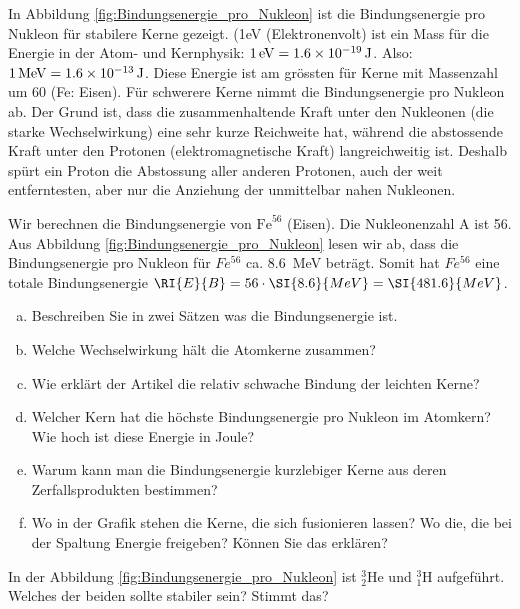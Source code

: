 \documentclass[12pt,a4paper,twoside]{article}
\begin{document}
In Abbildung \ref{fig:Bindungsenergie_pro_Nukleon} ist die Bindungsenergie pro Nukleon für stabilere Kerne gezeigt. 
(1eV (Elektronenvolt) ist ein Mass für die Energie in der Atom- und Kernphysik:
$\SI{1}{eV} = \SI{1.6E-19}{J}$. Also: $\SI{1}{MeV} = \SI{1.6E-13}{J}$.
Diese Energie ist am grössten für Kerne mit Massenzahl um 60 (Fe: Eisen).
Für schwerere Kerne nimmt die Bindungsenergie pro Nukleon ab. Der Grund ist,
dass die zusammenhaltende Kraft unter den Nukleonen (die starke Wechselwirkung) eine sehr kurze Reichweite hat,
während die abstossende Kraft unter den Protonen (elektromagnetische Kraft) langreichweitig ist.
Deshalb spürt ein Proton die Abstossung aller anderen Protonen, auch der weit entferntesten,
aber nur die Anziehung der unmittelbar nahen Nukleonen.

 


Wir berechnen die Bindungsenergie von $\text{Fe}^{56}$ (Eisen). 
Die Nukleonenzahl A ist 56. Aus Abbildung \ref{fig:Bindungsenergie_pro_Nukleon} lesen wir ab,
dass die Bindungsenergie pro Nukleon für $Fe^{56}$ ca. \SI{8.6}{MeV} beträgt. 
Somit hat $Fe^{56}$ eine totale Bindungsenergie $\RI{E}{B} = 56\cdot\SI{8.6}{MeV} = \SI{481.6}{MeV}$.




\begin{aufgabe}
	\begin{enumerate} [a)]
		\item Beschreiben Sie in zwei Sätzen was die Bindungsenergie ist.
		\item Welche Wechselwirkung hält die Atomkerne zusammen?
		\item Wie erklärt der Artikel die relativ schwache Bindung der leichten Kerne?
		\item Welcher Kern hat die höchste Bindungsenergie pro Nukleon im Atomkern? Wie hoch ist diese Energie in Joule?
		\item Warum kann man die Bindungsenergie kurzlebiger Kerne aus deren Zerfallsprodukten bestimmen?
		\item Wo in der Grafik stehen die Kerne, die sich fusionieren lassen? Wo die, die bei der Spaltung Energie freigeben? Können Sie das erklären?
	\end{enumerate}
\end{aufgabe}

\begin{aufgabe}
	In der Abbildung \ref{fig:Bindungsenergie_pro_Nukleon} ist $^3_2\text{He}$ und $^3_1\text{H}$ aufgeführt. 
	Welches der beiden sollte stabiler sein? Stimmt das?
\end{aufgabe}
\end{document}
